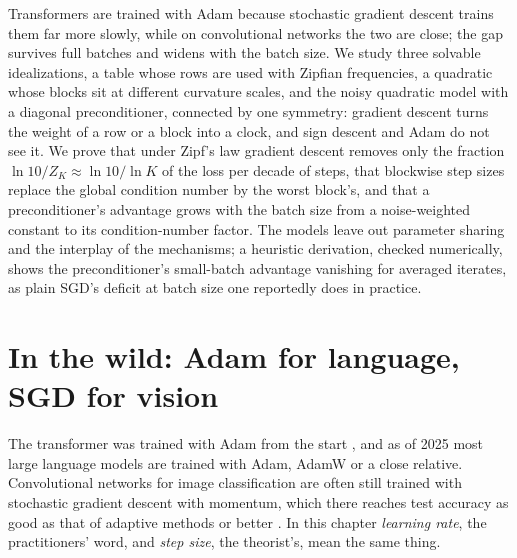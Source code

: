 
\begin{refsection}

\begin{chaptersummary}
Transformers are trained with Adam because stochastic gradient descent trains them far more slowly, while on convolutional networks the two are close; the gap survives full batches and widens with the batch size. We study three solvable idealizations, a table whose rows are used with Zipfian frequencies, a quadratic whose blocks sit at different curvature scales, and the noisy quadratic model with a diagonal preconditioner, connected by one symmetry: gradient descent turns the weight of a row or a block into a clock, and sign descent and Adam do not see it. We prove that under Zipf's law gradient descent removes only the fraction $\ln10/Z_K\approx\ln10/\ln K$ of the loss per decade of steps, that blockwise step sizes replace the global condition number by the worst block's, and that a preconditioner's advantage grows with the batch size from a noise-weighted constant to its condition-number factor. The models leave out parameter sharing and the interplay of the mechanisms; a heuristic derivation, checked numerically, shows the preconditioner's small-batch advantage vanishing for averaged iterates, as plain SGD's deficit at batch size one reportedly does in practice.
\end{chaptersummary}

\section{In the wild: Adam for language, SGD for vision}\label{sec:transformers:wild}

The transformer was trained with Adam from the start \parencite{VaswaniEtAl2017,KingmaBa2015}, and as of 2025 most large language models are trained with Adam, AdamW or a close relative. Convolutional networks for image classification are often still trained with stochastic gradient descent with momentum, which there reaches test accuracy as good as that of adaptive methods or better \parencite{WilsonEtAl2017}. In this chapter \emph{learning rate}, the practitioners' word, and \emph{step size}, the theorist's, mean the same thing.


\end{refsection}
